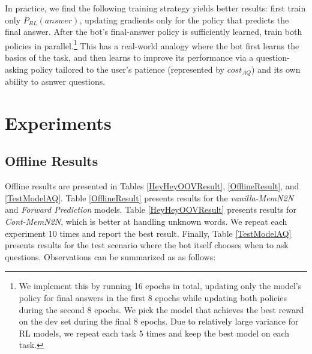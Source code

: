In practice, we find the following training strategy yields better results:
first train only $P_{RL}(answer)$, updating gradients only for the policy that
predicts the final answer.
After the bot's final-answer policy is sufficiently learned, train both policies in parallel.\footnote{
We implement this by running 16 epochs in total, updating only the model's policy for final answers in the first 8 epochs while updating both policies during the second 8 epochs. We pick the model that achieves the best reward on the dev set during the final 8 epochs. Due to relatively large variance for RL models, we repeat each task 5 times and keep the best model on each task.
}
This has a real-world analogy where the bot first learns the basics of the task, and then learns to
improve its performance via a question-asking policy tailored to the user's patience
(represented by $cost_{AQ}$) and its own ability to asnwer questions.

\section{Experiments}
\subsection{Offline Results}
Offline results are presented in Tables \ref{HeyHeyOOVResult}, \ref{OfflineResult}, and \ref{TestModelAQ}.
Table \ref{OfflineResult} presents results for the {\it vanilla-MemN2N} and
{\it Forward Prediction} models. Table \ref{HeyHeyOOVResult} presents results for {\it Cont-MemN2N},
which is better at handling unknown words.
We repeat each experiment 10 times and report the best result. 
Finally, Table \ref{TestModelAQ} presents results for the test scenario
 where the bot itself chooses when to ask questions.
Observations can be summarized as as follows:

